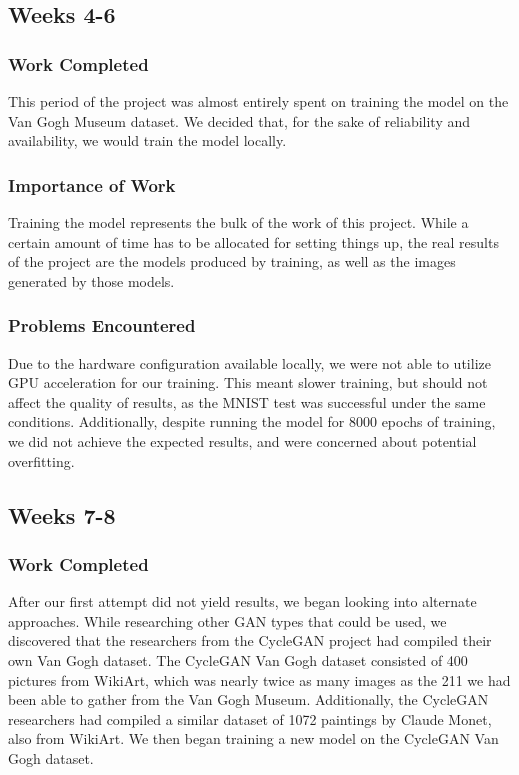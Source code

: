 \documentclass[12pt,letterpaper]{article}
\begin{document}
		\subsection{Weeks 4-6}
			\subsubsection{Work Completed}
				This period of the project was almost entirely spent on training the model on the Van Gogh Museum dataset.
				We decided that, for the sake of reliability and availability, we would train the model locally.
			\subsubsection{Importance of Work}
				Training the model represents the bulk of the work of this project.
				While a certain amount of time has to be allocated for setting things up, the real results of the project are the models produced by training, as well as the images generated by those models.
			\subsubsection{Problems Encountered}
				Due to the hardware configuration available locally, we were not able to utilize GPU acceleration for our training.
				This meant slower training, but should not affect the quality of results, as the MNIST test was successful under the same conditions.
				Additionally, despite running the model for 8000 epochs of training, we did not achieve the expected results, and were concerned about potential overfitting.

		\subsection{Weeks 7-8}
			\subsubsection{Work Completed}
				After our first attempt did not yield results, we began looking into alternate approaches.
				While researching other GAN types that could be used, we discovered that the researchers from the CycleGAN\cite{CycleGAN2017}\cite{isola2017image} project had compiled their own Van Gogh dataset.
				The CycleGAN Van Gogh dataset consisted of 400 pictures from WikiArt\cite{wikiartVanGogh}, which was nearly twice as many images as the 211 we had been able to gather from the Van Gogh Museum.
				Additionally, the CycleGAN researchers had compiled a similar dataset of 1072 paintings by Claude Monet, also from WikiArt.
				We then began training a new model on the CycleGAN Van Gogh dataset.
\end{document}
